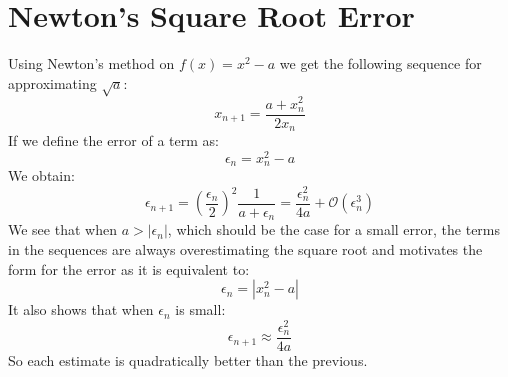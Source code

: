 
\section{Newton's Square Root Error}
Using Newton's method on $f(x) = x^2-a$ we get the following sequence for approximating $\sqrt{a}$:
\[x_{n+1} = \frac{a+x_n^2}{2x_n}\]
If we define the error of a term as:
\[\epsilon_n = x_n^2 - a\]
We obtain:
\[\epsilon_{n+1} = \left(\frac{\epsilon_n}{2}\right)^2\frac{1}{a+\epsilon_n}= \frac{\epsilon_n^2}{4a}+\mathcal{O}(\epsilon_n^3)\]
We see that when $a > |\epsilon_n|$, 
which should be the case for a small error, 
the terms in the sequences are always overestimating the square root and motivates the form for the error as it is equivalent to:
\[\epsilon_n = |x_n^2 - a|\]
It also shows that when $\epsilon_n$ is small:
\[\epsilon_{n+1} \approx \frac{\epsilon_n^2}{4a}\]
So each estimate is quadratically better than the previous.


